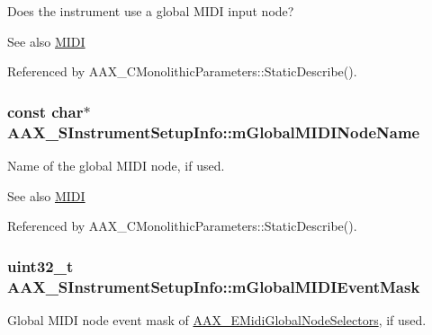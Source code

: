 Does the instrument use a global M\+I\+D\+I input node? 

\begin{DoxySeeAlso}{See also}
\hyperlink{a00336}{M\+I\+D\+I} 
\end{DoxySeeAlso}


Referenced by A\+A\+X\+\_\+\+C\+Monolithic\+Parameters\+::\+Static\+Describe().

\hypertarget{a00124_ae281e987dc73d0ff5d6ccbceb3383da9}{}
\subsubsection[{m\+Global\+M\+I\+D\+I\+Node\+Name}]{\setlength{\rightskip}{0pt plus 5cm}const char$\ast$ A\+A\+X\+\_\+\+S\+Instrument\+Setup\+Info\+::m\+Global\+M\+I\+D\+I\+Node\+Name}\label{a00124_ae281e987dc73d0ff5d6ccbceb3383da9}


Name of the global M\+I\+D\+I node, if used. 

\begin{DoxySeeAlso}{See also}
\hyperlink{a00336}{M\+I\+D\+I} 
\end{DoxySeeAlso}


Referenced by A\+A\+X\+\_\+\+C\+Monolithic\+Parameters\+::\+Static\+Describe().

\hypertarget{a00124_a3b64c64e7b90cb189eb24e5417d9d88b}{}
\subsubsection[{m\+Global\+M\+I\+D\+I\+Event\+Mask}]{\setlength{\rightskip}{0pt plus 5cm}uint32\+\_\+t A\+A\+X\+\_\+\+S\+Instrument\+Setup\+Info\+::m\+Global\+M\+I\+D\+I\+Event\+Mask}\label{a00124_a3b64c64e7b90cb189eb24e5417d9d88b}


Global M\+I\+D\+I node event mask of \hyperlink{a00206_a349dae6bc64bda67a5440cbc6637f92d}{A\+A\+X\+\_\+\+E\+Midi\+Global\+Node\+Selectors}, if used. 

